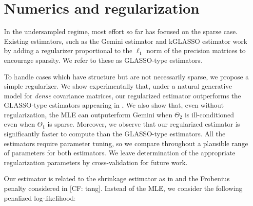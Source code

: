 \documentclass[aos]{imsart}
\theoremstyle{definition}
\numberwithin{equation}{section}
\newcommand{\CF}[1]{{\color{purple}[CF: #1]}}
\begin{document}
\section{Numerics and regularization}\label{sec:numerics}

In the undersampled regime, most effort so far has focused on the sparse case. Existing estimators, such as the Gemini estimator \cite{zhou2014gemini} and kGLASSO estimator \cite{tsiligkaridis2013convergence} work by adding a regularizer proportional to the $\ell_1$ norm of the precision matrices to encourage sparsity. We refer to these as GLASSO-type estimators.

To handle cases which have structure but are not necessarily sparse, we propose a simple regularizer. We show experimentally that, under a natural generative model for \emph{dense} covariance matrices, our regularized estimator outperforms the GLASSO-type estimators appearing in \cite{tsiligkaridis2013convergence,zhou2014gemini}. We also show that, even without regularization, the MLE can outputerform Gemini when $\Theta_2$ is ill-conditioned even when $\Theta_1$ is sparse. Moreover, we observe that our regularized estimator is significantly faster to compute than the GLASSO-type estimators. All the estimators require parameter tuning, so we compare throughout a plausible range of parameters for both estimators. We leave determination of the appropriate regularization parameters by cross-validation for future work.

 Our estimator is related to the shrinkage estimator as in \cite{goes2020robust} and the Frobenius penalty considered in \CF{tang}. Instead of the MLE, we consider the following penalized log-likelihood:
\end{document}

